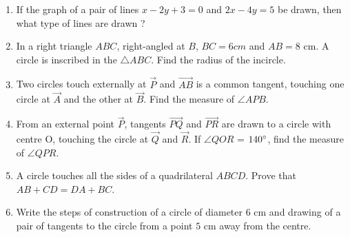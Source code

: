 \documentclass{article}
\begin{document}
\begin{enumerate}
\item If the graph of a pair of lines $x - 2y + 3 = 0$ and $2x - 4y = 5$ be drawn, then what type of lines are drawn ? 
  



   
		
\item In a right triangle $ABC$, right-angled at $B$, $BC = 6 cm$ and $AB = 8$ cm. A circle is inscribed in the $\triangle ABC$. Find the radius of the incircle. 
			
\item Two circles touch externally at $\vec{P}$ and $ \vec{AB} $ is a common tangent, touching one circle at $\vec{A}$ and the other at $\vec{B}$. Find the measure of $\angle APB$.

\item From an external point $\vec{P}$, tangents $\vec{PQ}$ and $\vec{PR}$ are drawn to a circle with centre O, touching the circle at $\vec{Q}$ and $\vec{R}$. If $\angle QOR$ = $140\degree$, find the measure of $\angle QPR$. 

\item A circle touches all the sides of a quadrilateral $ABCD$. Prove that $AB + CD = DA + BC$.

\item Write the steps of construction of a circle of diameter $6$ cm and drawing of a pair of tangents to the circle from a point $5$ cm away from the centre. 
		
\end{enumerate}	
\end{document}

